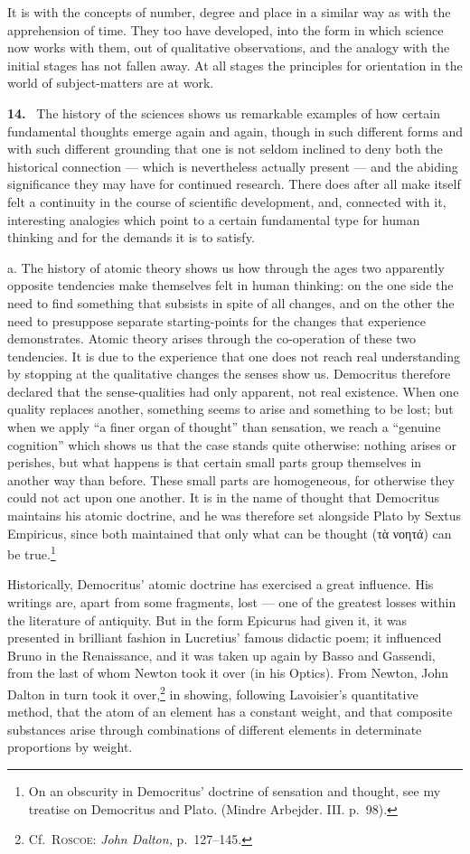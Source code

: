 \documentclass[12pt]{book}
\newcommand{\hnum}[1]{\noindent\textbf{#1.}~}
\newcommand{\opage}[1]{\marginnote{\footnotesize\textit{[#1]}}}
\begin{document}
It is with the concepts of number, degree and place in a similar way as with the
apprehension of time. They too have developed, into the form in which science
now works with them, out of qualitative observations, and the analogy with the
initial stages has not fallen away. At all stages the principles for orientation
in the world of subject-matters are at work.

\hnum{14} The history of the sciences shows us remarkable examples of how certain
fundamental thoughts emerge again and again, though in such different forms and
with such different grounding that one is not seldom inclined to deny both the
historical connection --- which is nevertheless actually present --- and the
abiding significance they may have for continued research. There does after all
make itself felt a continuity in the course of scientific development, and,
connected with it, interesting analogies which point to a certain \opage{71}fundamental
type for human thinking and for the demands it is to satisfy.

a. The history of atomic theory shows us how through the ages two apparently
opposite tendencies make themselves felt in human thinking: on the one side the
need to find something that subsists in spite of all changes, and on the other
the need to presuppose separate starting-points for the changes that experience
demonstrates. Atomic theory arises through the co-operation of these two
tendencies. It is due to the experience that one does not reach real
understanding by stopping at the qualitative changes the senses show us.
Democritus therefore declared that the sense-qualities had only apparent, not
real existence. When one quality replaces another, something seems to arise and
something to be lost; but when we apply ``a finer organ of thought'' than
sensation, we reach a ``genuine cognition'' which shows us that the case stands
quite otherwise: nothing arises or perishes, but what happens is that certain
small parts group themselves in another way than before. These small parts are
homogeneous, for otherwise they could not act upon one another. It is in the name
of thought that Democritus maintains his atomic doctrine, and he was therefore
set alongside Plato by Sextus Empiricus, since both maintained that only what can
be thought (τὰ νοητά) can be true.\footnote{On an obscurity in Democritus'
doctrine of sensation and thought, see my treatise on Democritus and Plato.
(Mindre Arbejder. III. p.\ 98).}

Historically, Democritus' atomic doctrine has exercised a great influence. His
writings are, apart from some fragments, lost --- one of the greatest losses
within the literature of antiquity. But in the form Epicurus had given it, it was
presented in brilliant fashion in Lucretius' famous didactic poem; \opage{72}it influenced
Bruno in the Renaissance, and it was taken up again by Basso and Gassendi, from
the last of whom Newton took it over (in his Optics). From Newton, John Dalton in
turn took it over,\footnote{Cf.\ \textsc{Roscoe:} \textit{John Dalton,} p.\
127--145.} in showing, following Lavoisier's quantitative method, that the atom
of an element has a constant weight, and that composite substances arise through
combinations of different elements in determinate proportions by weight.
\end{document}
